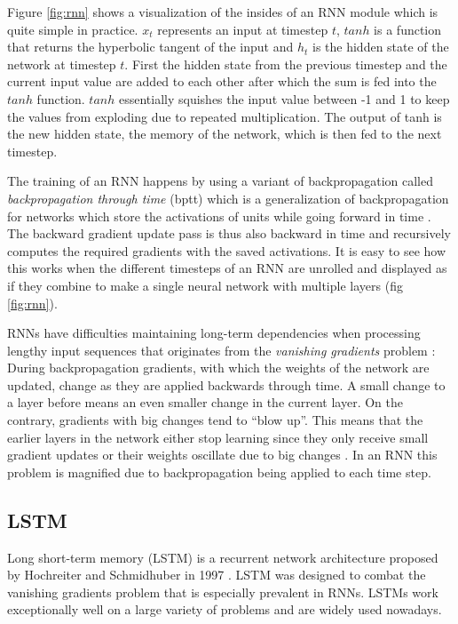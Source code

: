 Figure \ref{fig:rnn} shows a visualization of the insides of an RNN module which is quite simple in practice. $x_t$ represents an input at timestep $t$, $tanh$ is a function that returns the hyperbolic tangent of the input and $h_t$ is the hidden state of the network at timestep $t$.
First the hidden state from the previous timestep and the current input value are added to each other after which the sum is fed into the $tanh$ function.
$tanh$ essentially squishes the input value between -1 and 1 to keep the values from exploding due to repeated multiplication.
The output of tanh is the new hidden state, the memory of the network, which is then fed to the next timestep.


The training of an RNN happens by using a variant of backpropagation called \textit{backpropagation through time} (bptt) which is a generalization of backpropagation for networks which store the activations of units while going forward in time \cite{rumelhart1985}.
The backward gradient update pass is thus also backward in time and recursively computes the required gradients with the saved activations.
It is easy to see how this works when the different timesteps of an RNN are unrolled and displayed as if they combine to make a single neural network with multiple layers (fig \ref{fig:rnn}).


RNNs have difficulties maintaining long-term dependencies when processing lengthy input sequences that originates from the \textit{vanishing gradients} problem \cite{bengio1994}:
During backpropagation gradients, with which the weights of the network are updated, change as they are applied backwards through time.
A small change to a layer before means an even smaller change in the current layer.
On the contrary, gradients with big changes tend to ``blow up''.
This means that the earlier layers in the network either stop learning since they only receive small gradient updates or their weights oscillate due to big changes \cite{hochreiter1997}.
In an RNN this problem is magnified due to backpropagation being applied to each time step.

\subsection{LSTM} \label{LSTM}
Long short-term memory (LSTM) is a recurrent network architecture proposed by Hochreiter and Schmidhuber in 1997 \cite{hochreiter1997}.
LSTM was designed to combat the vanishing gradients problem that is especially prevalent in RNNs.
LSTMs work exceptionally well on a large variety of problems and are widely used nowadays.

